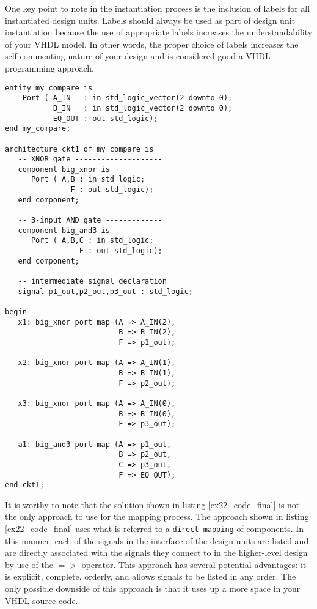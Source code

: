 One key point to note in the instantiation process is the inclusion of labels for all instantiated design units. Labels should always be used as part of design unit instantiation because the use of appropriate labels increases the understandability of your VHDL model. In other words, the proper choice of labels increases the self-commenting nature of your design and is considered good a VHDL programming approach.

\begin{lstlisting}[label=ex22_code_final, caption=VHDL code for the top of the design hierarchy for the 3-bit comparator.]
entity my_compare is
    Port ( A_IN   : in std_logic_vector(2 downto 0);
           B_IN   : in std_logic_vector(2 downto 0);
           EQ_OUT : out std_logic);
end my_compare;

architecture ckt1 of my_compare is 
   -- XNOR gate --------------------
   component big_xnor is
      Port ( A,B : in std_logic;
               F : out std_logic);
   end component;
 
   -- 3-input AND gate -------------
   component big_and3 is
      Port ( A,B,C : in std_logic;
                 F : out std_logic);
   end component;

   -- intermediate signal declaration
   signal p1_out,p2_out,p3_out : std_logic; 

begin
   x1: big_xnor port map (A => A_IN(2),
                          B => B_IN(2),
                          F => p1_out); 

   x2: big_xnor port map (A => A_IN(1),
                          B => B_IN(1),
                          F => p2_out); 
  
   x3: big_xnor port map (A => A_IN(0),
                          B => B_IN(0),
                          F => p3_out); 
  
   a1: big_and3 port map (A => p1_out,
                          B => p2_out, 
                          C => p3_out,
                          F => EQ_OUT); 
end ckt1;
\end{lstlisting}

It is worthy to note that the solution shown in listing \ref{ex22_code_final} is not the only approach to use for the mapping process. The approach shown in listing \ref{ex22_code_final} uses what is referred to a \texttt{direct mapping} of components. In this manner, each of the signals in the interface of the design units are listed and are directly associated with the signals they connect to in the higher-level design by use of the $=>$ operator. This approach has several potential advantages: it is explicit, complete, orderly, and allows signals to be listed in any order. The only possible downside of this approach is that it uses up a more space in your VHDL source code. 

